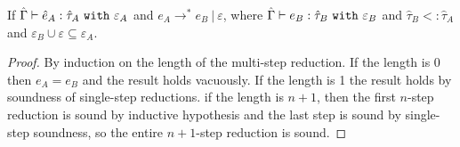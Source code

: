 \begin{theorem}
If $\hat \Gamma \vdash \hat e_A: \hat \tau_A~\mathtt{with}~ \varepsilon_A$ and $e_A \longrightarrow^{*} e_B~|~\varepsilon$, where $\hat \Gamma \vdash e_B: \hat \tau_B~\mathtt{with}~ \varepsilon_B$ and $\hat \tau_B <: \hat \tau_A$ and $\varepsilon_B \cup \varepsilon \subseteq \varepsilon_A$.
\end{theorem}

\begin{proof} By induction on the length of the multi-step reduction. If the length is 0 then $e_A = e_B$ and the result holds vacuously. If the length is 1 the result holds by soundness of single-step reductions. if the length is $n+1$, then the first $n$-step reduction is sound by inductive hypothesis and the last step is sound by single-step soundness, so the entire $n+1$-step reduction is sound.
\end{proof}







